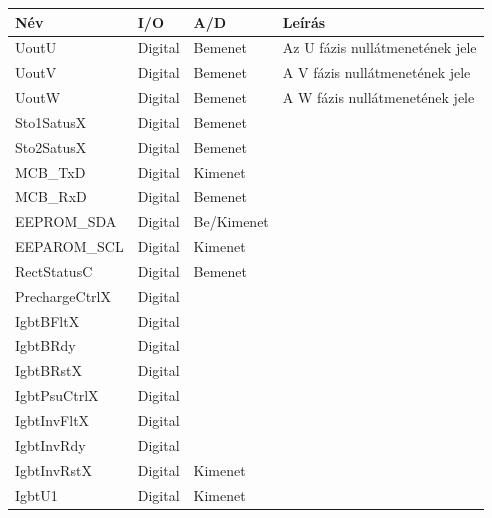 \begin{table}[]
\centering
\begin{tabular}{|l|l|l|l|}
\hline
\textbf{Név}   & \textbf{I/O} & \textbf{A/D} & \textbf{Leírás}                 \\ \hline
UoutU          & Digital      & Bemenet      & Az U fázis nullátmenetének jele \\ \hline
UoutV          & Digital      & Bemenet      & A V fázis nullátmenetének jele  \\ \hline
UoutW          & Digital      & Bemenet      & A W fázis nullátmenetének jele  \\ \hline
Sto1SatusX     & Digital      & Bemenet      &                                 \\ \hline
Sto2SatusX     & Digital      & Bemenet      &                                 \\ \hline
MCB\_TxD       & Digital      & Kimenet      &                                 \\ \hline
MCB\_RxD       & Digital      & Bemenet      &                                 \\ \hline
EEPROM\_SDA    & Digital      & Be/Kimenet   &                                 \\ \hline
EEPAROM\_SCL   & Digital      & Kimenet      &                                 \\ \hline
RectStatusC    & Digital      & Bemenet      &                                 \\ \hline
PrechargeCtrlX & Digital      &              &                                 \\ \hline
IgbtBFltX      & Digital      &              &                                 \\ \hline
IgbtBRdy       & Digital      &              &                                 \\ \hline
IgbtBRstX      & Digital      &              &                                 \\ \hline
IgbtPsuCtrlX   & Digital      &              &                                 \\ \hline
IgbtInvFltX    & Digital      &              &                                 \\ \hline
IgbtInvRdy     & Digital      &              &                                 \\ \hline
IgbtInvRstX    & Digital      & Kimenet      &                                 \\ \hline
IgbtU1         & Digital      & Kimenet      &                                 \\ \hline

\end{tabular}
\end{table}
